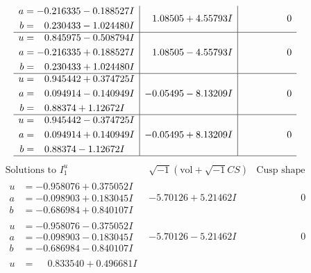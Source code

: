 \documentclass[1p]{elsarticle_modified}
\theoremstyle{definition}
\newcommand{\I}{\sqrt{-1}}
\begin{document}
$$\begin{array}{c|c|c}
\begin{aligned}
a &= -0.216335 - 0.188527 I \\
b &= \phantom{-}0.230433 - 1.024480 I\end{aligned}
 & \phantom{-}1.08505 + 4.55793 I & \phantom{-0.000000 } 0 \\ \hline\begin{aligned}
u &= \phantom{-}0.845975 - 0.508794 I \\
a &= -0.216335 + 0.188527 I \\
b &= \phantom{-}0.230433 + 1.024480 I\end{aligned}
 & \phantom{-}1.08505 - 4.55793 I & \phantom{-0.000000 } 0 \\ \hline\begin{aligned}
u &= \phantom{-}0.945442 + 0.374725 I \\
a &= \phantom{-}0.094914 - 0.140949 I \\
b &= \phantom{-}0.88374 + 1.12672 I\end{aligned}
 & -0.05495 - 8.13209 I & \phantom{-0.000000 } 0 \\ \hline\begin{aligned}
u &= \phantom{-}0.945442 - 0.374725 I \\
a &= \phantom{-}0.094914 + 0.140949 I \\
b &= \phantom{-}0.88374 - 1.12672 I\end{aligned}
 & -0.05495 + 8.13209 I & \phantom{-0.000000 } 0\\
 \hline 
 \end{array}$$\newpage$$\begin{array}{c|c|c}  
\text{Solutions to }I^u_{1}& \I (\text{vol} + \sqrt{-1}CS) & \text{Cusp shape}\\
 \hline 
\begin{aligned}
u &= -0.958076 + 0.375052 I \\
a &= -0.098903 + 0.183045 I \\
b &= -0.686984 + 0.840107 I\end{aligned}
 & -5.70126 + 5.21462 I & \phantom{-0.000000 } 0 \\ \hline\begin{aligned}
u &= -0.958076 - 0.375052 I \\
a &= -0.098903 - 0.183045 I \\
b &= -0.686984 - 0.840107 I\end{aligned}
 & -5.70126 - 5.21462 I & \phantom{-0.000000 } 0 \\ \hline\begin{aligned}
u &= \phantom{-}0.833540 + 0.496681 I \\

\end{aligned}
\end{array}$$
\end{document}
